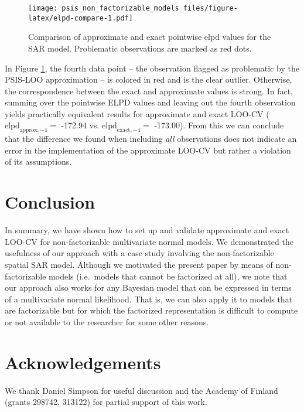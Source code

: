 \documentclass[english,,doc,floatsintext]{apa6}
\theoremstyle{definition}
\theoremstyle{definition}
\theoremstyle{definition}
\theoremstyle{remark}
\begin{document}
\begin{figure}
\centering
\texttt{[image: psis\_non\_factorizable\_models\_files/figure-latex/elpd-compare-1.pdf]}
\caption{\label{fig:elpd-compare}Comparison of approximate and exact
pointwise elpd values for the SAR model. Problematic observations are
marked as red dots.}
\end{figure}

In Figure \ref{fig:elpd-compare}, the fourth data point -- the
observation flagged as problematic by the PSIS-LOO approximation -- is
colored in red and is the clear outlier. Otherwise, the correspondence
between the exact and approximate values is strong. In fact, summing
over the pointwise ELPD values and leaving out the fourth observation
yields practically equivalent results for approximate and exact LOO-CV
(\(\text{elpd}_{\text{approx},-4} =\) -172.94 vs.
\(\text{elpd}_{\text{exact},-4} =\) -173.00). From this we can conclude
that the difference we found when including \emph{all} observations does
not indicate an error in the implementation of the approximate LOO-CV
but rather a violation of its assumptions.

\hypertarget{conclusion}{%
\section{Conclusion}\label{conclusion}}

In summary, we have shown how to set up and validate approximate and
exact LOO-CV for non-factorizable multivariate normal models. We
demonstrated the usefulness of our approach with a case study involving
the non-factorizable spatial SAR model. Although we motivated the
present paper by means of non-factorizable models (i.e.~models that
cannot be factorized at all), we note that our approach also works for
any Bayesian model that can be expressed in terms of a multivariate
normal likelihood. That is, we can also apply it to models that are
factorizable but for which the factorized representation is difficult to
compute or not available to the researcher for some other reasons.

\hypertarget{acknowledgements}{%
\section{Acknowledgements}\label{acknowledgements}}

We thank Daniel Simpson for useful discussion and the Academy of Finland
(grants 298742, 313122) for partial support of this work.
\end{document}

